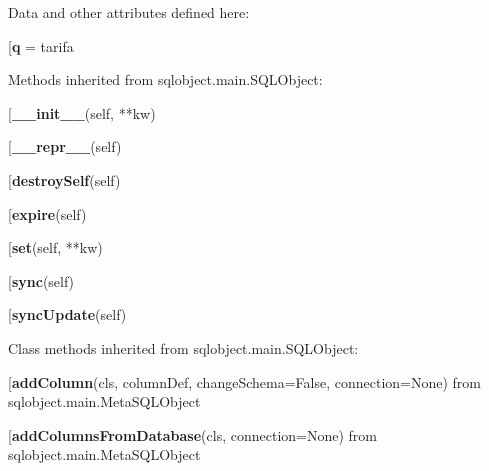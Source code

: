 Data and other attributes defined here:\\
\begin{description}\item[{\bf q} = tarifa\end{description}


Methods inherited from sqlobject.main.SQLObject:\\
\begin{description}\item[{\bf \_\_init\_\_}(self, **kw)\end{description}

\begin{description}\item[{\bf \_\_repr\_\_}(self)\end{description}

\begin{description}\item[{\bf destroySelf}(self)\end{description}

\begin{description}\item[{\bf expire}(self)\end{description}

\begin{description}\item[{\bf set}(self, **kw)\end{description}

\begin{description}\item[{\bf sync}(self)\end{description}

\begin{description}\item[{\bf syncUpdate}(self)\end{description}


Class methods inherited from sqlobject.main.SQLObject:\\
\begin{description}\item[{\bf addColumn}(cls, columnDef, changeSchema=False, connection=None) from sqlobject.main.MetaSQLObject\end{description}

\begin{description}\item[{\bf addColumnsFromDatabase}(cls, connection=None) from sqlobject.main.MetaSQLObject\end{description}

